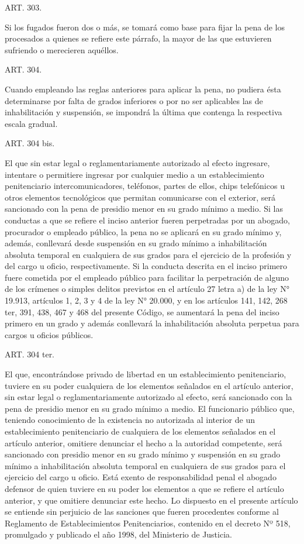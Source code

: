     ART. 303.

    Si los fugados fueron dos o más, se tomará como base para fijar la pena de los procesados a quienes se refiere este párrafo, la mayor de las que estuvieren sufriendo o merecieren aquéllos.



    ART. 304.

    Cuando empleando las reglas anteriores para aplicar la pena, no pudiera ésta determinarse por falta de grados inferiores o por no ser aplicables las de inhabilitación y suspensión, se impondrá la última que contenga la respectiva escala gradual.


    ART. 304 bis.

    El que sin estar legal o reglamentariamente autorizado al efecto ingresare, intentare o permitiere ingresar por cualquier medio a un establecimiento penitenciario intercomunicadores, teléfonos, partes de ellos, chips telefónicos u otros elementos tecnológicos que permitan comunicarse con el exterior, será sancionado con la pena de presidio menor en su grado mínimo a medio.
    Si las conductas a que se refiere el inciso anterior fueren perpetradas por un abogado, procurador o empleado público, la pena no se aplicará en su grado mínimo y, además, conllevará desde suspensión en su grado mínimo a inhabilitación absoluta temporal en cualquiera de sus grados para el ejercicio de la profesión y del cargo u oficio, respectivamente.
    Si la conducta descrita en el inciso primero fuere cometida por el empleado público para facilitar la perpetración de alguno de los crímenes o simples delitos previstos en el artículo 27 letra a) de la ley N° 19.913, artículos 1, 2, 3 y 4 de la ley N° 20.000, y en los artículos 141, 142, 268 ter, 391, 438, 467 y 468 del presente Código, se aumentará la pena del inciso primero en un grado y además conllevará la inhabilitación absoluta perpetua para cargos u oficios públicos.


    ART. 304 ter.

    El que, encontrándose privado de libertad en un establecimiento penitenciario, tuviere en su poder cualquiera de los elementos señalados en el artículo anterior, sin estar legal o reglamentariamente autorizado al efecto, será sancionado con la pena de presidio menor en su grado mínimo a medio.
    El funcionario público que, teniendo conocimiento de la existencia no autorizada al interior de un establecimiento penitenciario de cualquiera de los elementos señalados en el artículo anterior, omitiere denunciar el hecho a la autoridad competente, será sancionado con presidio menor en su grado mínimo y suspensión en su grado mínimo a inhabilitación absoluta temporal en cualquiera de sus grados para el ejercicio del cargo u oficio.
    Está exento de responsabilidad penal el abogado defensor de quien tuviere en su poder los elementos a que se refiere el artículo anterior, y que omitiere denunciar este hecho.
    Lo dispuesto en el presente artículo se entiende sin perjuicio de las sanciones que fueren procedentes conforme al Reglamento de Establecimientos Penitenciarios, contenido en el decreto Nº 518, promulgado y publicado el año 1998, del Ministerio de Justicia.

